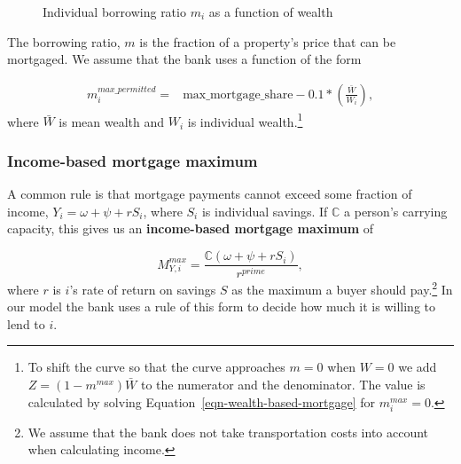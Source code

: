 {    \begin{figure}[htb]
    \begin{center}
    
    \end{center}
    \caption{Individual borrowing ratio $m_i$ as a function of wealth}
    \label{fig-borrowing-ratio}
    \end{figure}


The borrowing ratio, $m$ is the fraction of a property's price that can be mortgaged. We assume that the bank uses a function of the form 


\begin{align}
m_i^{max\_permitted} =& \mathrm{max\_mortgage\_share} - 0.1*\left(\frac{\bar W}{ W_i}\right), \label{eqn-wealth-based-mortgage}  %
\end{align} 
where $\bar{W}$ is mean wealth and $W_i$ is individual wealth.\footnote{To shift the curve  so that the curve approaches $m=0$ when $W=0$ we add  $Z=(1-m^{max})\bar W$ to the numerator and the denominator. The value is calculated by solving Equation~\ref{eqn-wealth-based-mortgage} for {$m_i^{max}=0$}.}


\subsubsection{Income-based mortgage maximum}
A common rule is that mortgage payments cannot exceed some fraction of income, $Y_i=\omega+ \psi + {r}S_i$, where $S_i$ is individual savings.
If $\mathbb{C}$ a person's carrying capacity, this gives us an \textbf{income-based  mortgage maximum} of 


\begin{equation}
M^{max}_{Y,i} = \frac{\mathbb{C} (\omega+ \psi + {r}S_i)}{r^{prime}},\label{eqn-income-based-mortgage}    
\end{equation}
where ${r}$ is $i$'s rate of return on savings $S$ as the maximum a  buyer should pay.\footnote{We  assume that the bank does not take transportation costs into account  when calculating income.}
In our model the bank uses a rule of this form to decide how much it is willing to lend to $i$.

}
